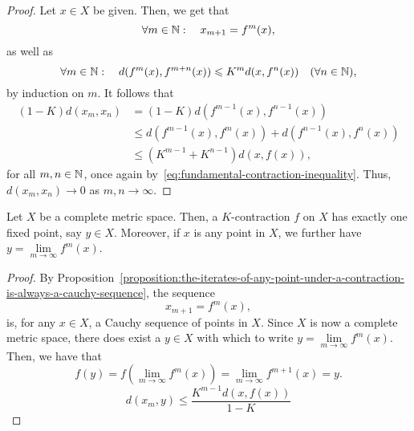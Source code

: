 \begin{proof}
  Let \(x\in{X}\) be given. Then, we get that
  \[
    \forall{m}\in\mathbb{N}:
    \quad{x_{m+1}=f^{m}(x)},
  \]
  as well as
  \[
    \forall{m}\in\mathbb{N}:
    \quad{d(f^{m}(x),f^{m+n}(x))\leqslant{K^{m}}d(x,f^{n}(x))}
    \quad{(\forall{n}\in\mathbb{N})},
  \]
  by induction on \(m\). It follows that
  \begin{equation}
    \begin{split}
      (1-K)d(x_{m},x_{n})
      &=
      (1-K)d(f^{m-1}(x),f^{n-1}(x))
      \\
      &\leqslant{d(f^{m-1}(x),f^{m}(x))+d(f^{n-1}(x),f^{n}(x))}
      \\
      &\leqslant{\left(K^{m-1}+K^{n-1}\right)d(x,f(x))},
    \end{split}
  \end{equation}
  for all \(m,n\in\mathbb{N}\), once again
  by~\eqref{eq:fundamental-contraction-inequality}. Thus,
  \(d(x_{m},x_{n})\to{0}\) as \(m,n\to\infty\).
\end{proof}

\begin{corollary}\label{corollary:banachs-contraction-principle}
  Let \(X\) be a complete metric space. Then, a \(K\)-contraction \(f\) on
  \(X\) has exactly one fixed point, say \(y\in{X}\). Moreover, if \(x\) is any
  point in \(X\), we further have \(y=\lim\limits_{m\to\infty}f^{m}(x)\).
\end{corollary}

\begin{proof}
  By
  Proposition~\ref{proposition:the-iterates-of-any-point-under-a-contraction-is-always-a-cauchy-sequence},
  the sequence
  \[
    x_{m+1}=f^{m}(x),
  \]
  is, for any \(x\in{X}\), a Cauchy sequence of points in \(X\). Since \(X\) is
  now a complete metric space, there does exist a \(y\in{X}\) with which to
  write \(y=\lim\limits_{m\to\infty}f^{m}(x)\). Then, we have that
  \[
    f(y)
    =
    f\left(\lim\limits_{m\to\infty}f^{m}(x)\right)
    =
    \lim\limits_{m\to\infty}f^{m+1}(x)
    =
    y.
  \]
  \[
    d(x_{m},y)\leqslant{\frac{K^{m-1}d(x,f(x))}{1-K}}
  \]
\end{proof}
